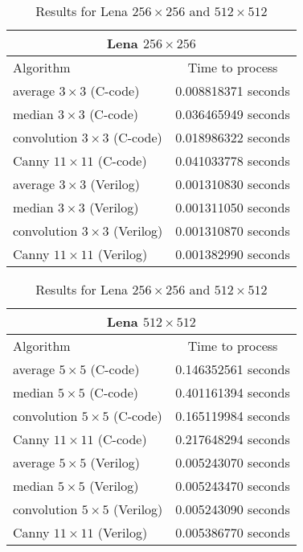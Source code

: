 \documentclass[10pt,twocolumn,letterpaper]{article}
\begin{document}
\begin{table}[!htb]
\footnotesize
        \begin{center}
                \begin{tabular}{|l|c|} \hline
		\multicolumn{2}{|c|}{{\bf Lena} \boldmath$256\times256$\unboldmath} \\ \hline
		Algorithm 				& 	Time to process \\ \hline\hline
		average $3\times3$ (C-code)		& 	0.008818371 seconds  \\ \hline
		median $3\times3$ (C-code)		& 	0.036465949 seconds  \\ \hline
		convolution $3\times3$ (C-code)		& 	0.018986322 seconds  \\ \hline 
		Canny $11\times11$ (C-code)		& 	0.041033778 seconds  \\ \hline \hline
		
		average $3\times3$ (Verilog)		& 	0.001310830 seconds  \\ \hline
		median $3\times3$ (Verilog)		& 	0.001311050 seconds  \\ \hline
		convolution $3\times3$ (Verilog)	& 	0.001310870 seconds  \\ \hline
		Canny $11\times11$ (Verilog)		& 	0.001382990 seconds  \\ \hline
		
		\end{tabular}

\vspace{1.25ex}

		\begin{tabular}{|l|c|} \hline
		\multicolumn{2}{|c|}{ {\bf Lena} \boldmath $512\times512$ \unboldmath } \\ \hline
		Algorithm 				& 	Time to process \\ \hline\hline
		average $5\times5$ (C-code)		& 	0.146352561 seconds  \\ \hline
		median $5\times5$ (C-code)		& 	0.401161394 seconds  \\ \hline
		convolution $5\times5$ (C-code)		& 	0.165119984 seconds  \\ \hline 
		Canny $11\times11$ (C-code)		& 	0.217648294 seconds  \\ \hline \hline
		
		average $5\times5$ (Verilog)		& 	0.005243070 seconds  \\ \hline
		median $5\times5$ (Verilog)		& 	0.005243470 seconds  \\ \hline
		convolution $5\times5$ (Verilog)	& 	0.005243090 seconds  \\ \hline
		Canny $11\times11$ (Verilog)		& 	0.005386770 seconds  \\ \hline
		
		\end{tabular}
		\caption{Results for Lena $256\times256$ and $512\times512$}
		\label{tab:res256and512}
	\end{center}
\end{table}
\end{document}
